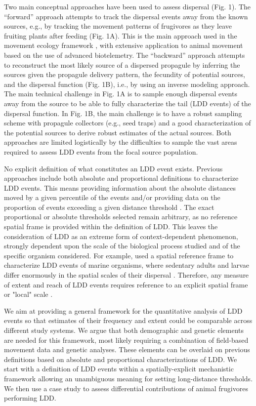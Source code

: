 \documentclass[a4paper, 12pt]{article}
\begin{document}
\begin{linenumbers}
Two main conceptual approaches have been used to assess dispersal (Fig. 1). The “forward” approach attempts to track the dispersal events away from the known sources, e.g., by tracking the movement patterns of frugivores as they leave fruiting plants after feeding (Fig. 1A). This is the main approach used in the movement ecology framework \citep{Nathan:2008fx}, with extensive application to animal movement based on the use of advanced biotelemetry. The “backward” approach attempts to reconstruct the most likely source of a dispersed propagule by inferring the sources given the propagule delivery pattern, the fecundity of potential sources, and the dispersal function (Fig. 1B), i.e., by using an inverse modeling approach. The main technical challenge in Fig. 1A is to sample enough dispersal events away from the source to be able to fully characterize the tail (LDD events) of the dispersal function. In Fig. 1B, the main challenge is to have a robust sampling scheme with propagule collectors (e.g., seed traps) and a good characterization of the potential sources to derive robust estimates of the actual sources. Both approaches are limited logistically by the difficulties to sample the vast areas required to assess LDD events from the focal source population.    

No explicit definition of what constitutes an LDD event exists. Previous approaches \citep[e.g., ][]{Nathan:2006aa,Schurr2009long} include both absolute and proportional definitions to characterize LDD events. This means providing information about the absolute distances moved by a given percentile of the events and/or providing data on the proportion of events exceeding a given distance threshold \citep{Nathan:2008is}. The exact proportional or absolute thresholds selected remain arbitrary, as no reference spatial frame is provided within the definition of LDD. This leaves the consideration of LDD as an extreme form of context-dependent phenomenon, strongly dependent upon the scale of the biological process studied \citep{Kinlan:2005fb} and of the specific organism considered. For example, \cite{Kinlan:2005fb} used a spatial reference frame to characterize LDD events of marine organisms, where sedentary adults and larvae differ enormously in the spatial scales of their dispersal \citep{DAloia:2013fc}. Therefore, any measure of extent and reach of LDD events requires reference to an explicit spatial frame or "local" scale \citep{Kinlan:2005fb}.

We aim at providing a general framework for the quantitative analysis of LDD events so that estimates of their frequency and extent could be comparable across different study systems. We argue that both demographic and genetic elements are needed for this framework, most likely requiring a combination of field-based movement data and genetic analyses. These elements can be overlaid on previous definitions based on absolute and proportional characterizations of LDD. We start with a definition of LDD events within a spatially-explicit mechanistic framework allowing an unambiguous meaning for setting long-distance thresholds. We then use a case study to assess differential contributions of animal frugivores performing LDD.


\end{linenumbers}
\end{document}
